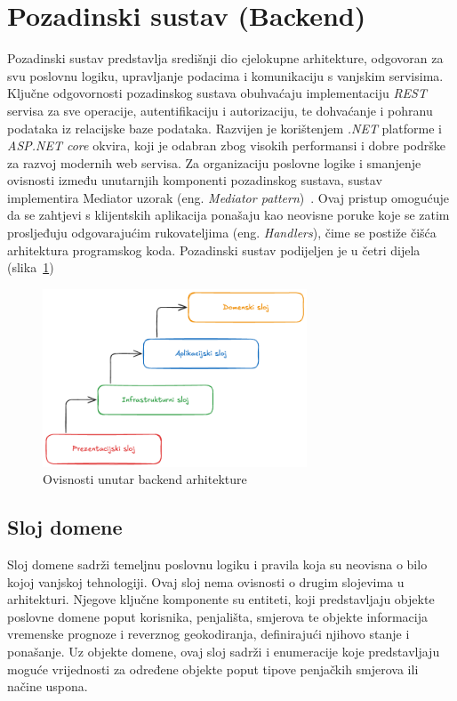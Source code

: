 \section{Pozadinski sustav (Backend)}

Pozadinski sustav predstavlja središnji dio cjelokupne arhitekture, odgovoran za svu poslovnu logiku, upravljanje podacima i komunikaciju s vanjskim servisima. Ključne odgovornosti pozadinskog sustava obuhvaćaju implementaciju \textit{REST} servisa za sve operacije, autentifikaciju i autorizaciju, te dohvaćanje i pohranu podataka iz relacijske baze podataka. 
Razvijen je korištenjem \textit{.NET} platforme i \textit{ASP.NET core} okvira, koji je odabran zbog visokih performansi i dobre podrške za razvoj modernih web servisa. Za organizaciju poslovne logike i smanjenje ovisnosti između unutarnjih komponenti pozadinskog sustava, sustav implementira Mediator uzorak (eng. \textit{Mediator pattern})~\cite{mediator_pattern}. 
Ovaj pristup omogućuje da se zahtjevi s klijentskih aplikacija ponašaju kao neovisne poruke koje se zatim prosljeđuju odgovarajućim rukovateljima (eng. \textit{Handlers}), čime se postiže čišća arhitektura programskog koda. Pozadinski sustav podijeljen je u četri dijela (slika~\ref{fig:backend_arch})

\begin{figure}[H]
    \centering
    \includegraphics[width=0.7\textwidth]{images/arhitektura/backend_arch.png}
    \caption{Ovisnosti unutar backend arhitekture}
    \label{fig:backend_arch}
\end{figure}

\subsection{Sloj domene}

Sloj domene sadrži temeljnu poslovnu logiku i pravila koja su neovisna o bilo kojoj vanjskoj tehnologiji. Ovaj sloj nema ovisnosti o drugim slojevima u arhitekturi. Njegove ključne komponente su entiteti, koji predstavljaju objekte poslovne domene poput korisnika, penjališta, smjerova te objekte informacija vremenske prognoze i reverznog geokodiranja, definirajući njihovo stanje i ponašanje. Uz objekte domene, ovaj sloj sadrži i enumeracije koje predstavljaju moguće vrijednosti za određene objekte poput tipove penjačkih smjerova ili načine uspona.

